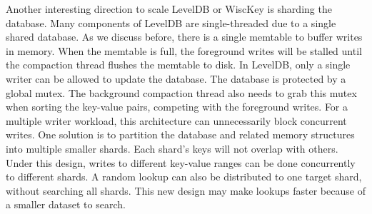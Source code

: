 Another interesting direction to scale LevelDB or WiscKey is
sharding the database. Many components of LevelDB are single-threaded
due to a single shared database.  As we discuss before, there is a
single memtable to buffer writes in memory. When the memtable is full,
the foreground writes will be stalled until the compaction thread
flushes the memtable to disk.  In LevelDB, only a single writer can be
allowed to update the database. The database is protected by a global
mutex. The background compaction thread also needs to grab this mutex
when sorting the key-value pairs, competing with the foreground
writes.  For a multiple writer workload, this architecture can
unnecessarily block concurrent writes.  One solution is to partition
the database and related memory structures into multiple smaller
shards. Each shard's keys will not overlap with others. Under this
design, writes to different key-value ranges can be done concurrently
to different shards.  A random lookup can also be distributed to one
target shard, without searching all shards.  This new design may make
lookups faster because of a smaller dataset to search.  
